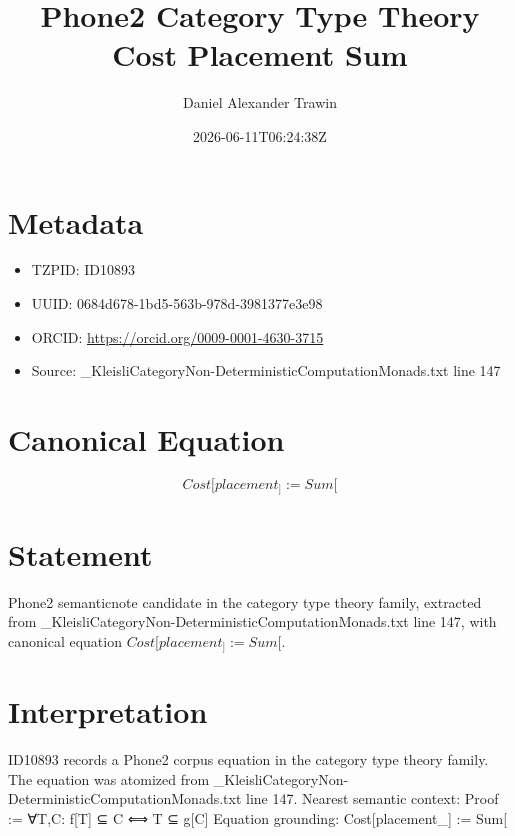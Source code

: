 \documentclass[11pt]{article}
\title{Phone2 Category Type Theory Cost Placement Sum}
\author{Daniel Alexander Trawin}
\date{2026-06-11T06:24:38Z}
\begin{document}
\maketitle
\section*{Metadata}
\begin{itemize}
\item TZPID: ID10893
\item UUID: 0684d678-1bd5-563b-978d-3981377e3e98
\item ORCID: \url{https://orcid.org/0009-0001-4630-3715}
\item Source: _KleisliCategoryNon-DeterministicComputationMonads.txt line 147
\end{itemize}
\section*{Canonical Equation}
\[
Cost[placement_] := Sum[
\]
\section*{Statement}
Phone2 semanticnote candidate in the category type theory family, extracted from _KleisliCategoryNon-DeterministicComputationMonads.txt line 147, with canonical equation $Cost[placement_] := Sum[$.
\section*{Interpretation}
ID10893 records a Phone2 corpus equation in the category type theory family. The equation was atomized from _KleisliCategoryNon-DeterministicComputationMonads.txt line 147. Nearest semantic context: Proof := ∀T,C: f[T] ⊆ C ⟺ T ⊆ g[C] Equation grounding: Cost[placement_] := Sum[
\end{document}
